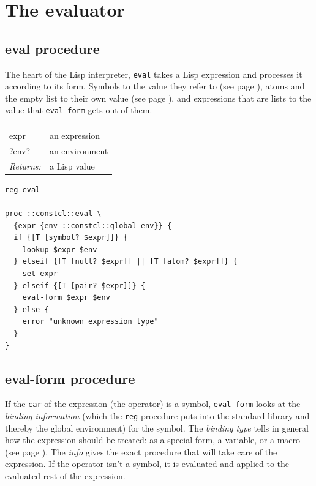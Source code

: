 \documentclass[twoside,9pt]{report}
\begin{document}
\section{The evaluator}
\label{the-evaluator}
\subsection{eval procedure}
\label{eval-procedure}


The heart of the Lisp interpreter, \texttt{eval} takes a Lisp expression and processes it according to its form. Symbols to the value they refer to (see page \pageref{variable-reference}), atoms and the empty list to their own value (see page \pageref{constant-literal}), and expressions that are lists to the value that \texttt{eval-form} gets out of them.

\noindent\begin{tabular}{ |p{1.9cm} p{8cm}| }
\hline
\rowcolor[HTML]{CCCCCC} \multicolumn{2}{|l|}{\bf eval (public)} \\
expr & an expression \\
?env? & an environment \\
\textit{Returns:} & a Lisp value \\
\hline
\end{tabular}
\begin{lstlisting}
reg eval

proc ::constcl::eval \
  {expr {env ::constcl::global_env}} {
  if {[T [symbol? $expr]]} {
    lookup $expr $env
  } elseif {[T [null? $expr]] || [T [atom? $expr]]} {
    set expr
  } elseif {[T [pair? $expr]]} {
    eval-form $expr $env
  } else {
    error "unknown expression type"
  }
}
\end{lstlisting}
\subsection{eval-form procedure}
\label{eval-form-procedure}


If the \texttt{car} of the expression (the operator) is a symbol, \texttt{eval-form} looks at the \emph{binding information} (which the \texttt{reg} procedure puts into the standard library and thereby the global environment) for the symbol. The \emph{binding type} tells in general how the expression should be treated: as a special form, a variable, or a macro (see page \pageref{macros}). The \emph{info} gives the exact procedure that will take care of the expression. If the operator isn't a symbol, it is evaluated and applied to the evaluated rest of the expression.
\end{document}
